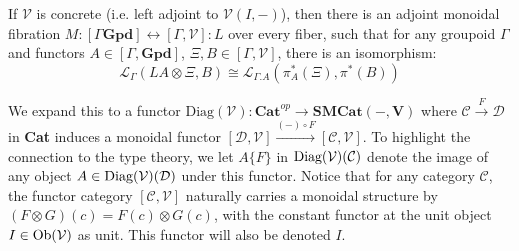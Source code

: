 \begin{thm}
  If $\mathcal{V}$ is concrete (i.e. left adjoint to $\mathcal{V}(I, -)$), then there is an adjoint monoidal fibration $M : [\Gamma \mathbf{Gpd}] \leftrightarrow [\Gamma, \mathcal{V}] : L$ over every fiber, such that for any groupoid $\Gamma$ and functors $A \in [\Gamma, \mathbf{Gpd}]$, $\Xi, B \in [\Gamma, \mathcal{V}]$, there is an isomorphism:
  \[
    \mathcal{L}_{\Gamma}(LA \otimes \Xi, B) \cong \mathcal{L}_{\Gamma.A}(\pi_A^*(\Xi), \pi^*(B))
  \]
\end{thm}

\newpage
We expand this to a functor $\text{Diag}(\mathcal{V}) : \mathbf{Cat}^{op} \to \mathbf{SMCat(-,V)}$ where $\mathcal{C} \xrightarrow{F} \mathcal{D}$ in \textbf{Cat} induces a monoidal functor $[\mathcal{D}, \mathcal{V}] \xrightarrow{(-) \circ F} [\mathcal{C}, \mathcal{V}]$. To highlight the connection to the type theory, we let $A\{F\}$ in  $\operatorname{\text{Diag}}(\mathcal{V})(\mathcal{C})$ denote the image of any object $A \in \operatorname{\text{Diag}}(\mathcal{V})(\mathcal{D})$ under this functor. Notice that for any category $\mathcal{C}$, the functor category $[\mathcal{C}, \mathcal{V}]$ naturally carries a monoidal structure by $(F \otimes G)(c) = F(c) \otimes G(c)$, with the constant functor at the unit object $I \in \mathcal{\operatorname{\text{Ob}}(V)}$ as unit. This functor will also be denoted $I$.
